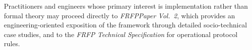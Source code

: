 Practitioners and engineers whose primary interest is implementation rather than formal
theory may proceed directly to \textit{FRFPPaper Vol.~2}, which provides an
engineering-oriented exposition of the framework through detailed socio-technical case
studies, and to the \textit{FRFP Technical Specification} for operational protocol rules.
